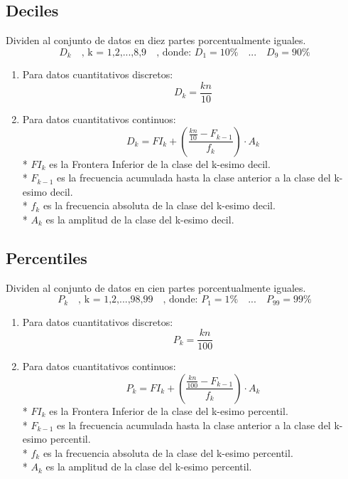 \documentclass{templateNote}
\begin{document}
\subsection{Deciles}
Dividen al conjunto de datos en diez partes porcentualmente iguales.
\[
    D_k \quad \text{, k = 1,2,...,8,9} \quad
    \text{, donde: } D_1 = 10\% \quad ...\quad D_9 = 90\%
\]
\begin{enumerate}
    \item Para datos cuantitativos discretos:
    \begin{equation*}
        D_k = \frac{kn}{10}
    \end{equation*}
    \item Para datos cuantitativos continuos:
    \begin{equation*}
        D_k = FI_k + \left(\frac{\displaystyle \frac{kn}{10} - F_{k-1}}{f_k}\right) \cdot A_k
    \end{equation*}
    * $FI_k$ es la Frontera Inferior de la clase del k-esimo decil.\\
    * $F_{k-1}$ es la frecuencia acumulada hasta la clase anterior a la clase del k-esimo decil. \\
    * $f_k$ es la frecuencia absoluta de la clase del k-esimo decil.\\
    * $A_k$ es la amplitud de la clase del k-esimo decil.\\
\end{enumerate}

\subsection{Percentiles}
Dividen al conjunto de datos en cien partes porcentualmente iguales.
\[
    P_k \quad \text{, k = 1,2,...,98,99} \quad
    \text{, donde: } P_1 = 1\% \quad ...\quad P_{99} = 99\%
\]
\begin{enumerate}
    \item Para datos cuantitativos discretos:
    \begin{equation*}
        P_k = \frac{kn}{100}
    \end{equation*}
    \item Para datos cuantitativos continuos:
    \begin{equation*}
        P_k = FI_k + \left(\frac{\displaystyle \frac{kn}{100} - F_{k-1}}{f_k}\right) \cdot A_k
    \end{equation*}
    * $FI_k$ es la Frontera Inferior de la clase del k-esimo percentil.\\
    * $F_{k-1}$ es la frecuencia acumulada hasta la clase anterior a la clase del k-esimo percentil. \\
    * $f_k$ es la frecuencia absoluta de la clase del k-esimo percentil.\\
    * $A_k$ es la amplitud de la clase del k-esimo percentil.\\
\end{enumerate}
\end{document}
